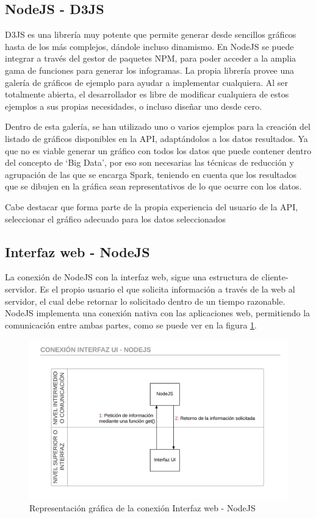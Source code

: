 \subsection{NodeJS - D3JS}

D3JS es una librería muy potente que permite generar desde sencillos gráficos hasta de los más complejos, dándole incluso dinamismo. En NodeJS se puede integrar a través del gestor de paquetes NPM, para poder acceder a la amplia gama de funciones para generar los infogramas. La propia librería provee una galería de gráficos de ejemplo \cite{D3JSGallery} para ayudar a implementar cualquiera. Al ser totalmente abierta, el desarrollador es libre de modificar cualquiera de estos ejemplos a sus propias necesidades, o incluso diseñar uno desde cero.

Dentro de esta galería, se han utilizado uno o varios ejemplos para la creación del listado de gráficos disponibles en la API, adaptándolos a los datos resultados. Ya que no es viable generar un gráfico con todos los datos que puede contener dentro del concepto de ‘Big Data’, por eso son necesarias las técnicas de reducción y agrupación de las que se encarga Spark, teniendo en cuenta que los resultados que se dibujen en la gráfica sean representativos de lo que ocurre con los datos. 

Cabe destacar que forma parte de la propia experiencia del usuario de la API, seleccionar el gráfico adecuado para los datos seleccionados

\subsection{Interfaz web - NodeJS}

La conexión de NodeJS con la interfaz web, sigue una estructura de cliente-servidor. Es el propio usuario el que solicita información a través de la web al servidor, el cual debe retornar lo solicitado dentro de un tiempo razonable. NodeJS implementa una conexión nativa con las aplicaciones web, permitiendo la comunicación entre ambas partes, como se puede ver en la figura \ref{fig:conexioninterfaznodejs}.

\begin{figure}
	\centering
	\includegraphics[width=1\linewidth]{imagenes/Conexion_Interfaz_NodeJS}
	\caption{Representación gráfica de la conexión Interfaz web - NodeJS}
	\label{fig:conexioninterfaznodejs}
\end{figure}

